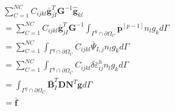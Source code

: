 \begin{equation}\label{CH4-barf}
\begin{split}
    &\sum_{C=1}^{N\!C}C_{ijkl}\bar{\pmb g}^T_{jI}\pmb{G}^{-1}\hat{\pmb g}_{kl}\\
    &=\sum_{C=1}^{N\!C}C_{ijkl}\bar{\pmb g}^T_{jI}\pmb{G}^{-1}\int_{\Gamma^g\cap\partial\Omega_C}\pmb{p}^{[p-1]}n_lg_kd\Gamma\\
    &=\sum_{C=1}^{N\!C}\int_{\Gamma^g\cap\partial\Omega_C}C_{ijkl}\bar{\Psi}_{I,j}n_lg_kd\Gamma\\
    &=\sum_{C=1}^{N\!C}\int_{\Gamma^g\cap\partial\Omega_C}C_{ijkl}\delta\bar{\varepsilon}_{ij}^hn_lg_kd\Gamma\\
    &=\int_{\Gamma^g\cap\partial\Omega_C}\bar{\pmb{B}}_I^T\pmb{D}\pmb{N}^T\pmb{g}d\Gamma\\
    &=\bar{\pmb f}
\end{split}
\end{equation}


